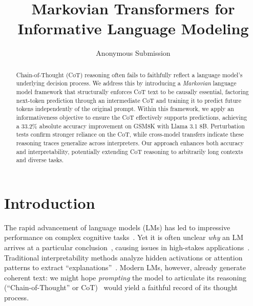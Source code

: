 \documentclass[letterpaper]{article} %
\title{Markovian Transformers for Informative Language Modeling}
\author{
    Anonymous Submission
}
\begin{document}
\maketitle

\begin{abstract}
  Chain-of-Thought (CoT) reasoning often fails to faithfully reflect a language model's underlying decision process. We address this by introducing a \emph{Markovian} language model framework that structurally enforces CoT text to be causally essential, factoring next-token prediction through an intermediate CoT and training it to predict future tokens independently of the original prompt. Within this framework, we apply an informativeness objective to ensure the CoT effectively supports predictions, achieving a 33.2\% absolute accuracy improvement on GSM8K with Llama 3.1 8B. Perturbation tests confirm stronger reliance on the CoT, while cross-model transfers indicate these reasoning traces generalize across interpreters. Our approach enhances both accuracy and interpretability, potentially extending CoT reasoning to arbitrarily long contexts and diverse tasks.
\
\end{abstract}


\section{Introduction}
\label{sec:intro}
The rapid advancement of language models (LMs) has led to impressive performance on complex cognitive tasks~\citep{NEURIPS2020_1457c0d6}. Yet it is often unclear \emph{why} an LM arrives at a particular conclusion~\citep{lamparth2023analyzing,burns2024discovering,gurnee2024language}, causing issues in high-stakes applications~\citep{Grabb2024.04.07.24305462,lamparth2024human,rivera2024escalation}. Traditional interpretability methods analyze hidden activations or attention patterns to extract ``explanations''~\citep{geiger2022inducing,geva2022transformer,meng2022locating,raukur2022toward,wang2022interpretability,lamparth2023analyzing,nanda2023progress}. Modern LMs, however, already generate coherent text: we might hope \emph{prompting} the model to articulate its reasoning (``Chain-of-Thought'' or CoT)~\citep{nye2022show,wei2022chain} would yield a faithful record of its thought process. 
\end{document}
